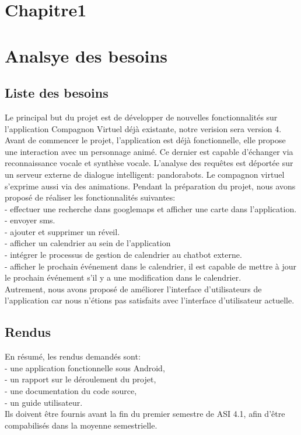 \section*{Chapitre1}
\section{Analsye des besoins}
\subsection{Liste des besoins}
Le principal but du projet est de développer de nouvelles fonctionnalités sur l'application Compagnon Virtuel déjà existante, notre verision sera version 4.
Avant de commencer le projet, l'application est déjà fonctionnelle, elle propose une interaction avec un personnage animé. Ce dernier est capable d'échanger via reconnaissance vocale et synthèse vocale. L'analyse des requêtes est déportée sur un serveur externe de dialogue intelligent: pandorabots. Le compagnon virtuel s'exprime aussi via des animations. Pendant la préparation du projet, nous avons proposé de réaliser les fonctionnalités suivantes:\\
	\indent- effectuer une recherche dans googlemaps et afficher une carte dans l'application.\\
	\indent- envoyer sms.\\
	\indent- ajouter et supprimer un réveil.\\
	\indent- afficher un calendrier au sein de l'application\\
	\indent- intégrer le processus de gestion de calendrier au chatbot externe.\\
	\indent- afficher le prochain événement dans le calendrier, il est capable de mettre à jour le prochain événement s'il y a une modification dans le calendrier.\\
	
Autrement, nous avons proposé de améliorer l'interface d'utilisateurs de l'application car nous n'étions pas satisfaits avec l'interface d'utilisateur actuelle.

\subsection{Rendus}
En résumé, les rendus demandés sont:\\
    \indent- une application fonctionnelle sous Android,\\
    \indent- un rapport sur le déroulement du projet,\\
    \indent- une documentation du code source,\\
    \indent- un guide utilisateur.\\
\indent Ils doivent être fournis avant la fin du premier semestre de ASI 4.1, afin d'être compabilisés dans la moyenne semestrielle.
\newpage
